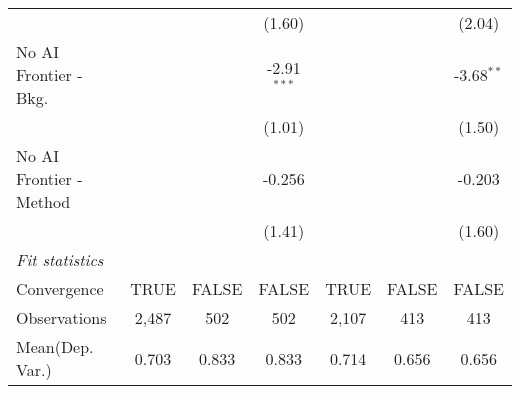 \begin{tabular}{lcccccc}
                           &              &         & (1.60)        &              &         & (2.04)\\   
   No AI Frontier - Bkg.   &              &         & -2.91$^{***}$ &              &         & -3.68$^{**}$\\   
                           &              &         & (1.01)        &              &         & (1.50)\\   
   No AI Frontier - Method &              &         & -0.256        &              &         & -0.203\\   
                           &              &         & (1.41)        &              &         & (1.60)\\   
   \midrule
   \emph{Fit statistics}\\
   Convergence             &TRUE          & FALSE   & FALSE         & TRUE         & FALSE   & FALSE\\  
   Observations            & 2,487        & 502     & 502           & 2,107        & 413     & 413\\  
Mean(Dep. Var.) & 0.703 & 0.833 & 0.833 & 0.714 & 0.656 & 0.656 \\
   

\end{tabular}
